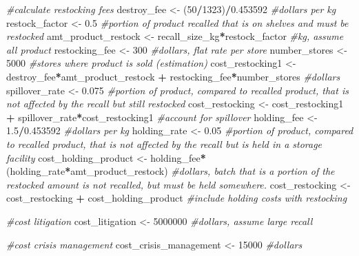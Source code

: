 \documentclass[
]{article}
\newenvironment{Shaded}{\begin{snugshade}}{\end{snugshade}}
\newcommand{\CommentTok}[1]{\textcolor[rgb]{0.56,0.35,0.01}{\textit{#1}}}
\newcommand{\DecValTok}[1]{\textcolor[rgb]{0.00,0.00,0.81}{#1}}
\newcommand{\FloatTok}[1]{\textcolor[rgb]{0.00,0.00,0.81}{#1}}
\newcommand{\NormalTok}[1]{#1}
\newcommand{\OtherTok}[1]{\textcolor[rgb]{0.56,0.35,0.01}{#1}}
\newcommand{\SpecialCharTok}[1]{\textcolor[rgb]{0.81,0.36,0.00}{\textbf{#1}}}
\begin{document}
\begin{Shaded}
\begin{Highlighting}[]
\CommentTok{\#calculate restocking fees}
\NormalTok{destroy\_fee }\OtherTok{\textless{}{-}}\NormalTok{ (}\DecValTok{50}\SpecialCharTok{/}\DecValTok{1323}\NormalTok{)}\SpecialCharTok{/}\FloatTok{0.453592}  \CommentTok{\#dollars per kg}
\NormalTok{restock\_factor }\OtherTok{\textless{}{-}} \FloatTok{0.5} \CommentTok{\#portion of product recalled that is on shelves and must be restocked}
\NormalTok{amt\_product\_restock }\OtherTok{\textless{}{-}}\NormalTok{ recall\_size\_kg}\SpecialCharTok{*}\NormalTok{restock\_factor }\CommentTok{\#kg, assume all product}
\NormalTok{restocking\_fee }\OtherTok{\textless{}{-}} \DecValTok{300} \CommentTok{\#dollars, flat rate per store}
\NormalTok{number\_stores }\OtherTok{\textless{}{-}} \DecValTok{5000} \CommentTok{\#stores where product is sold (estimation)}
\NormalTok{cost\_restocking1 }\OtherTok{\textless{}{-}}\NormalTok{ destroy\_fee}\SpecialCharTok{*}\NormalTok{amt\_product\_restock }\SpecialCharTok{+}\NormalTok{ restocking\_fee}\SpecialCharTok{*}\NormalTok{number\_stores  }\CommentTok{\#dollars}
\NormalTok{spillover\_rate }\OtherTok{\textless{}{-}} \FloatTok{0.075} \CommentTok{\#portion of product, compared to recalled product, that is not affected by the recall but still restocked}
\NormalTok{cost\_restocking }\OtherTok{\textless{}{-}}\NormalTok{ cost\_restocking1 }\SpecialCharTok{+}\NormalTok{ spillover\_rate}\SpecialCharTok{*}\NormalTok{cost\_restocking1 }\CommentTok{\#account for spillover }
\NormalTok{holding\_fee }\OtherTok{\textless{}{-}} \FloatTok{1.5}\SpecialCharTok{/}\FloatTok{0.453592} \CommentTok{\#dollars per kg}
\NormalTok{holding\_rate }\OtherTok{\textless{}{-}} \FloatTok{0.05} \CommentTok{\#portion of product, compared to recalled product, that is not affected by the recall but is held in a storage facility}
\NormalTok{cost\_holding\_product }\OtherTok{\textless{}{-}}\NormalTok{ holding\_fee}\SpecialCharTok{*}\NormalTok{(holding\_rate}\SpecialCharTok{*}\NormalTok{amt\_product\_restock) }\CommentTok{\#dollars, batch that is a portion of the restocked amount is not recalled, but must be held somewhere.}
\NormalTok{cost\_restocking }\OtherTok{\textless{}{-}}\NormalTok{ cost\_restocking }\SpecialCharTok{+}\NormalTok{ cost\_holding\_product }\CommentTok{\#include holding costs with restocking}

\CommentTok{\#cost litigation}
\NormalTok{cost\_litigation }\OtherTok{\textless{}{-}} \DecValTok{5000000} \CommentTok{\#dollars, assume large recall}

\CommentTok{\#cost crisis management}
\NormalTok{cost\_crisis\_management }\OtherTok{\textless{}{-}} \DecValTok{15000} \CommentTok{\#dollars}


\end{Highlighting}
\end{Shaded}
\end{document}
